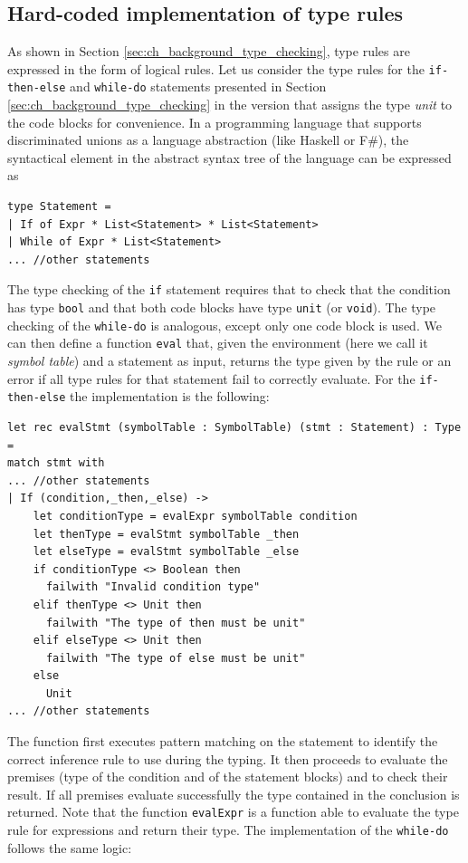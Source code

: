 \subsection{Hard-coded implementation of type rules}
\label{sec:ch_metacasanova_hc_type_rules}
As shown in Section \ref{sec:ch_background_type_checking}, type rules are expressed in the form of logical rules. Let us consider the type rules for the \texttt{if-then-else} and \texttt{while-do} statements presented in Section \ref{sec:ch_background_type_checking} in the version that assigns the type \textit{unit} to the code blocks for convenience. In a programming language that supports discriminated unions as a language abstraction (like Haskell or F\#), the syntactical element in the abstract syntax tree of the language can be expressed as

\begin{lstlisting}
type Statement =
| If of Expr * List<Statement> * List<Statement>
| While of Expr * List<Statement>
... //other statements
\end{lstlisting}

The type checking of the \texttt{if} statement requires that to check that the condition has type \texttt{bool} and that both code blocks have type \texttt{unit} (or \texttt{void}). The type checking of the \texttt{while-do} is analogous, except only one code block is used. We can then define a function \texttt{eval} that, given the environment (here we call it \textit{symbol table}) and a statement as input, returns the type given by the rule or an error if all type rules for that statement fail to correctly evaluate. For the 
\texttt{if-then-else} the implementation is the following:

\begin{lstlisting}
let rec evalStmt (symbolTable : SymbolTable) (stmt : Statement) : Type =
match stmt with
... //other statements
| If (condition,_then,_else) ->
    let conditionType = evalExpr symbolTable condition
    let thenType = evalStmt symbolTable _then
    let elseType = evalStmt symbolTable _else
    if conditionType <> Boolean then
      failwith "Invalid condition type"
    elif thenType <> Unit then
      failwith "The type of then must be unit"
    elif elseType <> Unit then
      failwith "The type of else must be unit"
    else
      Unit
... //other statements
\end{lstlisting}

\noindent
The function first executes pattern matching on the statement to identify the correct inference rule to use during the typing. It then proceeds to evaluate the premises (type of the condition and of the statement blocks) and to check their result. If all premises evaluate successfully the type contained in the conclusion is returned. Note that the function \texttt{evalExpr} is a function able to evaluate the type rule for expressions and return their type. 
The implementation of the \texttt{while-do} follows the same logic:

